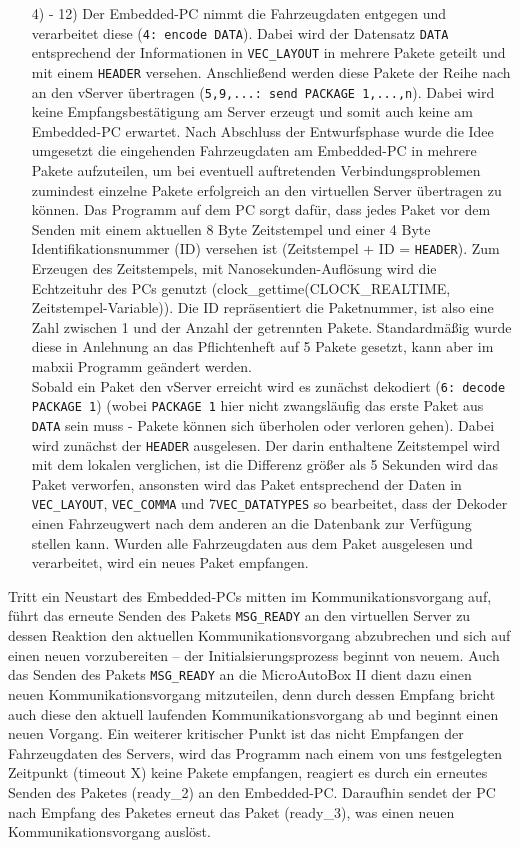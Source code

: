 \documentclass[fontsize = 12pt, paper = a4]{scrreprt}
\begin{document}
\begin{itemize}
\item[4) - 12)]
Der Embedded-PC nimmt die Fahrzeugdaten entgegen und verarbeitet diese (\texttt{4: encode DATA}). Dabei wird der Datensatz \texttt{DATA} entsprechend der Informationen in \texttt{VEC\_LAYOUT} in mehrere Pakete geteilt und mit einem \texttt{HEADER} versehen. Anschließend werden diese Pakete der Reihe nach an den vServer übertragen (\texttt{5,9,...: send PACKAGE 1,...,n}). Dabei wird keine Empfangsbestätigung am Server erzeugt und somit auch keine am Embedded-PC erwartet. 
Nach Abschluss der Entwurfsphase wurde die Idee umgesetzt die eingehenden Fahrzeugdaten am Embedded-PC in mehrere Pakete aufzuteilen, um bei eventuell auftretenden Verbindungsproblemen zumindest einzelne Pakete erfolgreich an den virtuellen Server übertragen zu können. Das Programm auf dem PC sorgt dafür, dass jedes Paket vor dem Senden mit einem aktuellen 8 Byte Zeitstempel und einer 4 Byte Identifikationsnummer (ID) versehen ist (Zeitstempel + ID = \texttt{HEADER}). Zum Erzeugen des Zeitstempels, mit Nanosekunden-Auflösung wird die Echtzeituhr des PCs genutzt (clock\_gettime(CLOCK\_REALTIME, Zeitstempel-Variable)). Die ID repräsentiert die Paketnummer, ist also eine Zahl zwischen 1 und der Anzahl der getrennten Pakete. Standardmäßig wurde diese in Anlehnung an das Pflichtenheft auf 5 Pakete gesetzt, kann aber im mabxii Programm geändert werden. \\
Sobald ein Paket den vServer erreicht wird es zunächst dekodiert (\texttt{6: decode PACKAGE 1}) (wobei \texttt{PACKAGE 1} hier nicht zwangsläufig das erste Paket aus \texttt{DATA} sein muss - Pakete können sich überholen oder verloren gehen). Dabei wird zunächst der \texttt{HEADER} ausgelesen. Der darin enthaltene Zeitstempel wird mit dem lokalen verglichen, ist die Differenz größer als 5 Sekunden wird das Paket verworfen, ansonsten wird das Paket entsprechend der Daten in \texttt{VEC\_LAYOUT}, \texttt{VEC\_COMMA} und 7\texttt{VEC\_DATATYPES} so bearbeitet, dass der Dekoder einen Fahrzeugwert nach dem anderen an die Datenbank zur Verfügung stellen kann. Wurden alle Fahrzeugdaten aus dem Paket ausgelesen und verarbeitet, wird ein neues Paket empfangen. 

\end{itemize}

Tritt ein Neustart des Embedded-PCs mitten im Kommunikationsvorgang auf, führt das erneute Senden des Pakets \texttt{MSG\_READY} an den virtuellen Server zu dessen Reaktion den aktuellen Kommunikationsvorgang abzubrechen und sich auf einen neuen vorzubereiten -- der Initialsierungsprozess beginnt von neuem. Auch das Senden des Pakets \texttt{MSG\_READY} an die MicroAutoBox II dient dazu einen neuen Kommunikationsvorgang mitzuteilen, denn durch dessen Empfang bricht auch diese den aktuell laufenden Kommunikationsvorgang ab und beginnt einen neuen Vorgang. Ein weiterer kritischer Punkt ist das nicht Empfangen der Fahrzeugdaten des Servers, wird das Programm nach einem von uns festgelegten Zeitpunkt (timeout X) keine Pakete empfangen, reagiert es durch ein erneutes Senden des Paketes (ready\_2) an den Embedded-PC. Daraufhin sendet der PC nach Empfang des Paketes erneut das Paket (ready\_3), was einen neuen Kommunikationsvorgang auslöst. 
\end{document}
